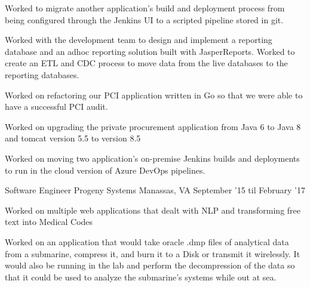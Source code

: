\begin{cventries}
{\begin{cvitems}
        \item {Worked to migrate another application's build and deployment process from being configured 
            through the Jenkins UI to a scripted pipeline stored in git.}
        \item {Worked with the development team to design and implement a reporting database and an adhoc reporting solution built with JasperReports.
            Worked to create an ETL and CDC process to move data from the live databases to the reporting databases.}
        \item {Worked on refactoring our PCI application written in Go so that we were able to have a successful PCI audit.}
        \item {Worked on upgrading the private procurement application from Java 6 to Java 8 and tomcat version 5.5 to version 8.5}
        \item {Worked on moving two application's on-premise Jenkins builds and deployments to run in the cloud version of Azure DevOps pipelines.}
        \end{cvitems}
    }

    \cventry
    {Software Engineer} %
    {Progeny Systems} %
    {Manassas, VA} %
    {September '15 til February '17} %
    {
        \begin{cvitems} %
        \item {Worked on multiple web applications that dealt with NLP and transforming free text into Medical Codes}
        \item {Worked on an application that would take oracle .dmp files of analytical data from a submarine,
            compress it, and burn it to a Disk or transmit it wirelessly. It would also be running in the lab 
            and perform the decompression of the data so that it could be used to analyze the submarine's systems while out at sea.}
        \end{cvitems}
    }
\end{cventries}
